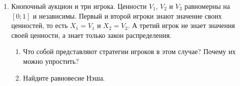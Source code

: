 \begin{enumerate}
\item Кнопочный аукцион и три игрока. Ценности $ V_{1} $, $ V_{2} $ и $ V_{3} $ равномерны на $ [0;1] $ и независимы. Первый и второй игроки знают значение своих ценностей, то есть $ X_{1}=V_{1} $ и $ X_{2}=V_{2} $. А третий игрок не знает значения своей ценности, а знает только закон распределения. 
\begin{enumerate}
\item Что собой представляют стратегии игроков в этом случае? Почему их можно упростить?
\item Найдите равновесие Нэша.
\end{enumerate}


\end{enumerate}
